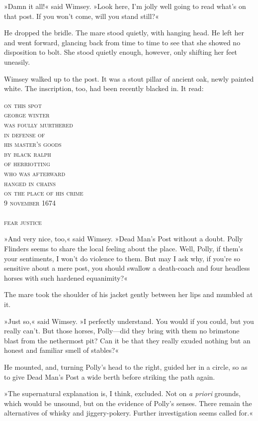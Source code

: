 »Damn it all!« said Wimsey. »Look here, I'm jolly well going to read what's on that post. If you won't come, will you stand still?«

He dropped the bridle. The mare stood quietly, with hanging head. He left her and went forward, glancing back from time to time to see that she showed no disposition to bolt. She stood quietly enough, however, only shifting her feet uneasily.

Wimsey walked up to the post. It was a stout pillar of ancient oak, newly painted white. The inscription, too, had been recently blacked in. It read:

\begin{center}\scshape
on this spot\\
george winter\\
was foully murthered\\
in defense of\\
his master's goods\\
by black ralph\\
of herriotting\\
who was afterward\\
hanged in chains\\
on the place of his crime\\
9 november 1674\\
~\\
fear justice
\end{center}

»And very nice, too,« said Wimsey. »Dead Man's Post without a doubt. Polly Flinders seems to share the local feeling about the place. Well, Polly, if them's your sentiments, I won't do violence to them. But may I ask why, if you're so sensitive about a mere post, you should swallow a death-coach and four headless horses with such hardened equanimity?«

The mare took the shoulder of his jacket gently between her lips and mumbled at it.

»Just so,« said Wimsey. »I perfectly understand. You would if you could, but you really can't. But those horses, Polly—did they bring with them no brimstone blast from the nethermost pit? Can it be that they really exuded nothing but an honest and familiar smell of stables?«

He mounted, and, turning Polly's head to the right, guided her in a circle, so as to give Dead Man's Post a wide berth before striking the path again.

»The supernatural explanation is, I think, excluded. Not on \textit{a priori} grounds, which would be unsound, but on the evidence of Polly's senses. There remain the alternatives of whisky and jiggery-pokery. Further investigation seems called for.«

